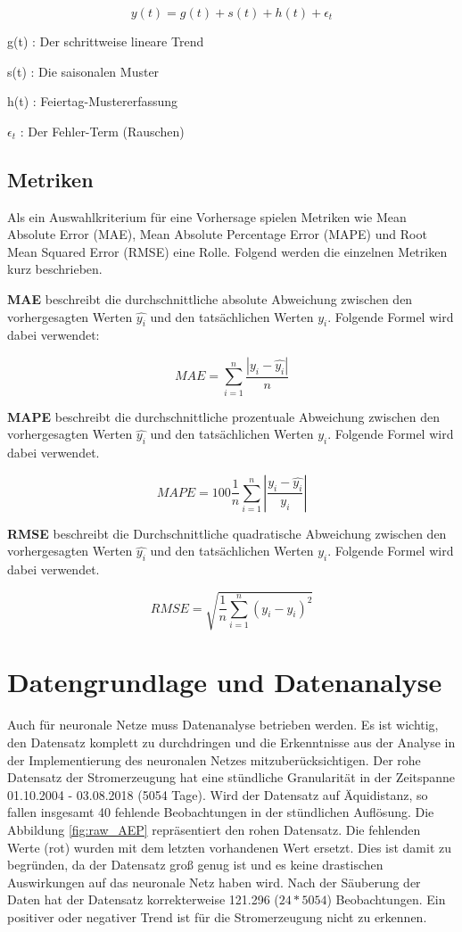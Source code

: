 \documentclass[11pt,ngerman,a4paper,]{article}
\begin{document}
\[
y(t) = g(t) + s(t) + h(t) + \epsilon_t
\]

g(t) : Der schrittweise lineare Trend

s(t) : Die saisonalen Muster

h(t) : Feiertag-Mustererfassung

\(\epsilon_t\) : Der Fehler-Term (Rauschen)

\clearpage
\newpage

\subsection{Metriken}\label{metriken}

Als ein Auswahlkriterium für eine Vorhersage spielen Metriken wie Mean Absolute Error (MAE), Mean Absolute Percentage Error (MAPE) und Root Mean Squared Error (RMSE) eine Rolle. Folgend werden die einzelnen Metriken kurz beschrieben.

\textbf{MAE} beschreibt die durchschnittliche absolute Abweichung zwischen den vorhergesagten Werten \(\hat{y_i}\) und den tatsächlichen Werten \(y_i\). Folgende Formel wird dabei verwendet:

\[
MAE = \sum_{i=1}^{n} \frac{| y_i - \hat{y_i} | }{n}
\]

\textbf{MAPE} beschreibt die durchschnittliche prozentuale Abweichung zwischen den vorhergesagten Werten \(\hat{y_i}\) und den tatsächlichen Werten \(y_i\). Folgende Formel wird dabei verwendet.

\[
MAPE = 100 \frac{1}{n} \sum_{i=1}^{n} | \frac{ y_i - \hat{y_i}  }{y_i} |
\]

\textbf{RMSE} beschreibt die Durchschnittliche quadratische Abweichung zwischen den vorhergesagten Werten \(\hat{y_i}\) und den tatsächlichen Werten \(y_i\). Folgende Formel wird dabei verwendet.

\[
RMSE = \sqrt{\frac{1}{n} \sum_{i=1}^{n}  (y_i - \hat{y_i})^2}
\]

\clearpage
\newpage

\section{Datengrundlage und Datenanalyse}\label{datengrundlage-und-datenanalyse}

Auch für neuronale Netze muss Datenanalyse betrieben werden. Es ist wichtig, den Datensatz komplett zu durchdringen und die Erkenntnisse aus der Analyse in der Implementierung des neuronalen Netzes mitzuberücksichtigen. Der rohe Datensatz der Stromerzeugung hat eine stündliche Granularität in der Zeitspanne 01.10.2004 - 03.08.2018 (5054 Tage). Wird der Datensatz auf Äquidistanz, so fallen insgesamt 40 fehlende Beobachtungen in der stündlichen Auflösung. Die Abbildung \ref{fig:raw_AEP} repräsentiert den rohen Datensatz. Die fehlenden Werte (rot) wurden mit dem letzten vorhandenen Wert ersetzt. Dies ist damit zu begründen, da der Datensatz groß genug ist und es keine drastischen Auswirkungen auf das neuronale Netz haben wird. Nach der Säuberung der Daten hat der Datensatz korrekterweise 121.296 (\(24*5054\)) Beobachtungen. Ein positiver oder negativer Trend ist für die Stromerzeugung nicht zu erkennen.
\end{document}
